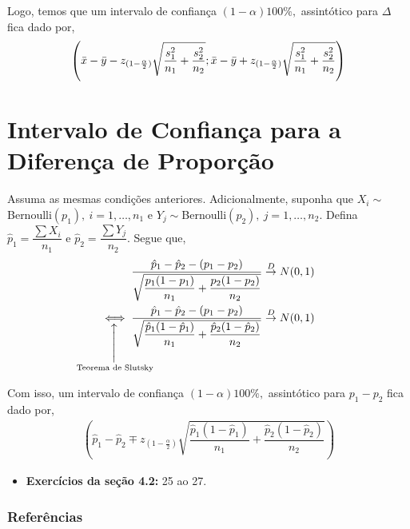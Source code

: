 \documentclass[12pt]{beamer}
\begin{document}
\begin{frame}{}
\begin{block}{}
\justifying
Logo, temos que um intervalo de confiança $(1-\alpha)100\%,$ assintótico para $\Delta$ fica dado por,
\begin{align*}
\left(\Bar{x}-\Bar{y}-z_{(1-\frac{\alpha}{2})}\sqrt{\frac{s_{1}^{2}}{n_{1}}+\frac{s_{2}^{2}}{n_{2}}};\Bar{x}-\Bar{y}+z_{(1-\frac{\alpha}{2})}\sqrt{\frac{s_{1}^{2}}{n_{1}}+\frac{s_{2}^{2}}{n_{2}}}\right)
\end{align*}
\end{block}
\end{frame}

\section{Intervalo de Confiança para a Diferença de Proporção}
\begin{frame}{}
\begin{block}{}
\justifying
Assuma as mesmas condições anteriores. Adicionalmente, suponha que $X_{i}\sim$Bernoulli$(p_{1}),~i=1,\ldots,n_{1}$ e $Y_{j}\sim$Bernoulli$(p_{2}),~j=1,\ldots,n_{2}.$ Defina $\hat{p}_{1}=\dfrac{\sum X_{i}}{n_{1}}$ e $\hat{p}_{2}=\dfrac{\sum Y_{j}}{n_{2}}.$ Segue que,
\begin{align*}
    \dfrac{\hat{p}_{1}-\hat{p}_{2}-(p_{1}-p_{2})}{\sqrt{\dfrac{p_{1}(1-p_{1})}{n_{1}}+\dfrac{p_{2}(1-p_{2})}{n_{2}}}}&\ConvD N(0,1)\\
    \SetaUP{\text{Teorema de Slutsky}}{\SeSe} 
    \dfrac{\hat{p}_{1}-\hat{p}_{2}-(p_{1}-p_{2})}{\sqrt{\dfrac{\hat{p}_{1}(1-\hat{p}_{1})}{n_{1}}+\dfrac{\hat{p}_{2}(1-\hat{p}_{2})}{n_{2}}}}&\ConvD N(0,1)
\end{align*}
\end{block}
\end{frame}

\begin{frame}{}
\begin{block}{}
\justifying
Com isso, um intervalo de confiança $(1-\alpha)100\%,$ assintótico para $p_{1}-p_{2}$ fica dado por,
\begin{align*}
    \left(\hat{p}_{1}-\hat{p}_{2}\mp z_{(1-\frac{\alpha}{2})}\sqrt{\dfrac{\hat{p}_{1}(1-\hat{p}_{1})}{n_{1}}+\dfrac{\hat{p}_{2}(1-\hat{p}_{2})}{n_{2}}}\right)
\end{align*}
\nocite{hogg}
\end{block}
\end{frame}

\begin{frame}{\Home}
\begin{block}{}
\justifying

\begin{itemize}
    \item \textbf{Exercícios da seção 4.2:} 25 ao 27.
\end{itemize}

\end{block}
\end{frame}

\begin{frame}[allowframebreaks]
\frametitle{\bf Referências}
\printbibliography
\end{frame}
\end{document}
